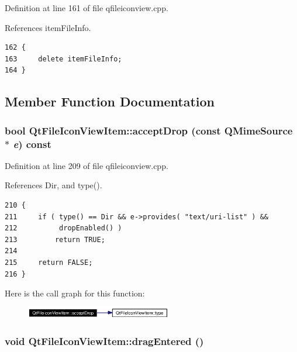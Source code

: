 Definition at line 161 of file qfileiconview.cpp.

References item\-File\-Info.



\footnotesize\begin{verbatim}162 {
163     delete itemFileInfo;
164 }
\end{verbatim}\normalsize 


\subsection{Member Function Documentation}
\subsubsection{\setlength{\rightskip}{0pt plus 5cm}bool Qt\-File\-Icon\-View\-Item::accept\-Drop (const QMime\-Source $\ast$ {\em e}) const\hspace{0.3cm}{\tt  [virtual]}}\label{classQtFileIconViewItem_QtFileIconViewItema4}




Definition at line 209 of file qfileiconview.cpp.

References Dir, and type().



\footnotesize\begin{verbatim}210 {
211     if ( type() == Dir && e->provides( "text/uri-list" ) &&
212          dropEnabled() )
213         return TRUE;
214 
215     return FALSE;
216 }
\end{verbatim}\normalsize 


Here is the call graph for this function:\begin{figure}[H]
\begin{center}
\leavevmode
\includegraphics[width=180pt]{classQtFileIconViewItem_QtFileIconViewItema4_cgraph}
\end{center}
\end{figure}
\subsubsection{\setlength{\rightskip}{0pt plus 5cm}void Qt\-File\-Icon\-View\-Item::drag\-Entered ()\hspace{0.3cm}{\tt  [virtual]}}\label{classQtFileIconViewItem_QtFileIconViewItema7}





